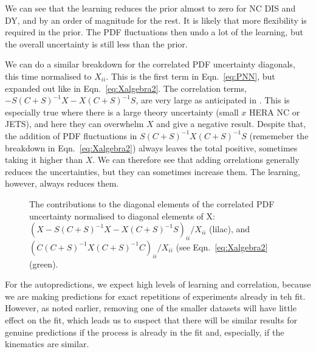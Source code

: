 We can see that the learning reduces the prior almost to zero for NC DIS and DY, and by an order of magnitude for the rest. It is likely that more flexibility is required in the prior. The PDF fluctuations then undo a lot of the learning, but the overall uncertainty is still less than the prior.

We can do a similar breakdown for the correlated PDF uncertainty diagonals, this time normalised to $X_{ii}$. This is the first term in Eqn.~\ref{eq:PNN}, but expanded out like in Eqn.~\ref{eq:Xalgebra2}. The correlation terms, $-S(C+S)^{-1}X-X(C+S)^{-1}S$, are very large as anticipated in \cite{Harland-Lang:2018bxd}. This is especially true where there is a large theory uncertainty (small $x$ HERA NC or JETS), and here they can overwhelm $X$ and give a negative result. Despite that, the addition of PDF fluctuations in $S(C+S)^{-1}X(C+S)^{-1}S$ (rememeber the breakdown in Eqn.~\ref{eq:Xalgebra2}) always leaves the total positive, sometimes taking it higher than $X$. We can therefore see that adding orrelations generally reduces the uncertainties, but they can sometimes increase them. The learning, however, always reduces them.
\begin{figure}[H]
    \begin{center}
    \end{center}
  \vspace{-0.55cm}
  \caption{The contributions to the diagonal elements of the correlated PDF uncertainty normalised to diagonal elements of X: $(X-S(C+S)^{-1}X-X(C+S)^{-1}S)_{ii}/X_{ii}$ (lilac), and  $(C(C+S)^{-1}X(C+S)^{-1}C )_{ii}/X_{ii}$  (see Eqn.~\ref{eq:Xalgebra2} (green).}
  \label{fig:Xcpts}
\end{figure}
For the autopredictions, we expect high levels of learning and correlation, because we are making predictions for exact repetitions of experiments already in teh fit. However, as noted earlier, removing one of the smaller datasets will have little effect on the fit, which leads us to suspect that there will be similar results for genuine predictions if the process is already in the fit and, especially, if the kinematics are similar.

